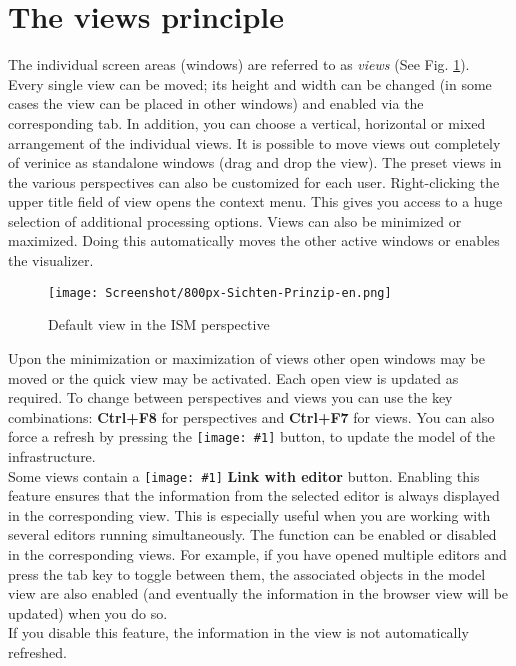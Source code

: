 \documentclass[a4paper,10pt]{book}
\newcommand{\icon}[1]{\texttt{[image: \#1]}}
\begin{document}
\section{The views principle}
The individual screen areas (windows) are referred to as {\em views} (See Fig. \ref{Default view in the ISM perspective}).
\newline\\
 Every single view can be moved; its height and width can be changed (in some cases the view can be placed
 in other windows) and enabled via the corresponding tab. In addition, you can choose a vertical, horizontal or
 mixed arrangement of the individual views. It is possible to move views out completely of verinice as
 standalone windows (drag and drop the view). The preset views in the various perspectives can also be
 customized for each user. Right-clicking the upper title field of view opens the context menu. This gives
 you access to a huge selection of additional processing options. Views can also be minimized or maximized.
 Doing this automatically moves the other active windows or enables the visualizer.
\newline\\
\begin{figure}[htb!]
  \centering
  \texttt{[image: Screenshot/800px-Sichten-Prinzip-en.png]}
  \caption{\label{Default view in the ISM perspective} Default view in the ISM perspective}
\end{figure}
Upon the minimization or maximization of views other open windows may be moved or the quick view may be
activated. Each open view is updated as required. To change between perspectives and views you can use the key combinations:
\textbf{Ctrl+F8} for perspectives and \textbf{Ctrl+F7} for views. You can also force a refresh by pressing the
\icon{Icon/Aktualisieren.png} button, to update the model of the infrastructure.
\newline\\
Some views contain a \icon{Icon/Verinice_linked.png} \textbf{Link with editor} button.
Enabling this feature ensures that the information from the selected editor is always displayed in the corresponding view.
This is especially useful when you are working with several editors running simultaneously.
The function can be enabled or disabled in the corresponding views. For example, if you have opened
multiple editors and press the tab key to toggle between them, the associated
objects in the model view are also enabled (and eventually the information in
the browser view will be updated) when you do so.
\newline\\
If you disable this feature, the information in the view is not automatically refreshed.
\end{document}
